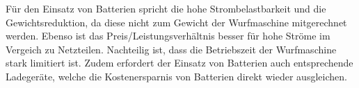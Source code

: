 Für den Einsatz von Batterien spricht die hohe Strombelastbarkeit und die
Gewichtsreduktion, da diese nicht zum Gewicht der Wurfmaschine mitgerechnet
werden. Ebenso ist das Preis/Leistungsverhältnis besser für
hohe Ströme im Vergeich zu Netzteilen. Nachteilig ist, dass die Betriebszeit
der Wurfmaschine stark limitiert ist. Zudem erfordert der Einsatz von
Batterien auch entsprechende Ladegeräte, welche die Kostenersparnis von
Batterien direkt wieder ausgleichen.
